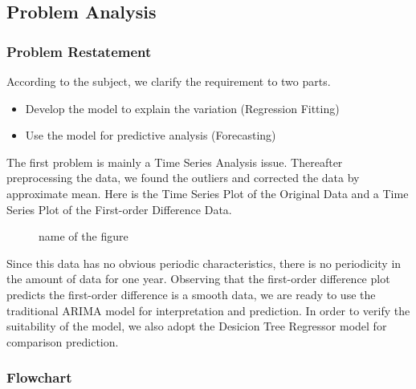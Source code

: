 \documentclass{mcmthesis}
\begin{document}
\subsection{Problem Analysis}
\subsubsection{Problem Restatement}

\hspace*{0.6cm}According to the subject, we clarify the requirement to two parts.
\begin{itemize}
\item Develop the model to explain the variation (Regression Fitting) 
\item Use the model for predictive analysis (Forecasting) 
\end{itemize}

The first problem is mainly a Time Series Analysis issue. Thereafter preprocessing the data, we found the outliers and corrected the data by approximate mean. Here is the Time Series Plot of the Original Data and a Time Series Plot of the First-order Difference Data.
\begin{figure}[htbp]
\centering    %
\caption{name of the figure} %
\label{fig:1}  %
\end{figure}

Since this data has no obvious periodic characteristics, there is no periodicity in the amount of data for one year. Observing that the first-order difference plot predicts the first-order difference is a smooth data, we are ready to use the traditional ARIMA model for interpretation and prediction. In order to verify the suitability of the model, we also adopt the Desicion Tree Regressor model for comparison prediction.

\subsubsection{Flowchart}
\end{document}
